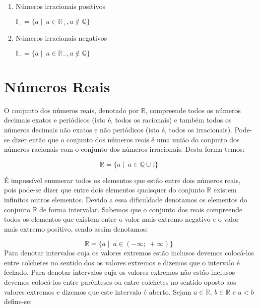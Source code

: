 \documentclass[]{book}
\begin{document}
\begin{enumerate}
\def\labelenumi{\arabic{enumi}.}
\item
  Números irracionais positivos

  \(\mathbb{I}_{+} = \{a \mid \ a \in \mathbb{R}_{+}, a \notin \mathbb{Q} \}\)
\item
  Números irracionais negativos

  \(\mathbb{I}_{-} = \{a \mid \ a \in \mathbb{R}_{-}, a \notin \mathbb{Q} \}\)
\end{enumerate}

\section{Números Reais}\label{numeros-reais}

O conjunto dos números reais, denotado por \(\mathbb{R}\), compreende
todos os números decimais exatos e periódicos (isto é, todos os
racionais) e também todos os números decimais não exatos e não
periódicos (isto é, todos os irracionais). Pode-se dizer então que o
conjunto dos números reais é uma união do conjunto dos números racionais
com o conjunto dos números irracionais. Desta forma temos:

\[\mathbb{R} = \{ a \mid \ a \in \mathbb{Q} \cup \mathbb{I} \}\]

É impossível enumerar todos os elementos que estão entre dois números
reais, pois pode-se dizer que entre dois elementos quaisquer do conjunto
\(\mathbb{R}\) existem infinitos outros elementos. Devido a essa
dificuldade denotamos os elementos do conjunto \(\mathbb{R}\) de forma
intervalar. Sabemos que o conjunto dos reais compreende todos os
elementos que existem entre o valor mais extremo negativo e o valor mais
extremo positivo, sendo assim denotamos:

\[\mathbb{R} = \{a \mid \ a \in (-\infty; \ +\infty ) \}\] Para denotar
intervalos cuja os valores extremos estão inclusos devemos colocá-los
entre colchetes no sentido dos os valores extremos e dizemos que o
intervalo é fechado. Para denotar intervalos cuja os valores extremos
não estão inclusos devemos colocá-los entre parênteses ou entre
colchetes no sentido oposto aos valores extremos e dizemos que este
intervalo é aberto. Sejam \(a \in \mathbb{R}\), \(b \in \mathbb{R}\) e
\(a < b\) define-se:
\end{document}
